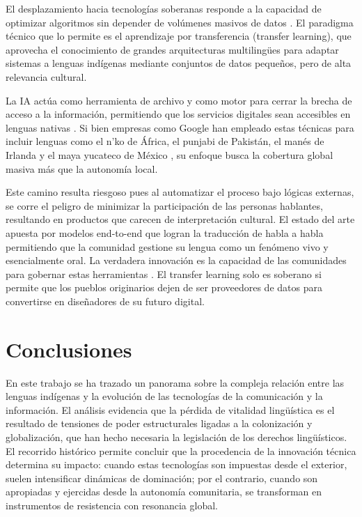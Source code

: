 \documentclass[spanish]{textolivre}
\begin{document}
El desplazamiento hacia tecnologías soberanas responde a la capacidad de optimizar algoritmos sin depender de volúmenes masivos de datos \cite{GonzalezSantillan2021,Joshi2020,Littell2018}. El paradigma técnico que lo permite es el aprendizaje por transferencia (transfer learning), que aprovecha el conocimiento de grandes arquitecturas multilingües para adaptar sistemas a lenguas indígenas mediante conjuntos de datos pequeños, pero de alta relevancia cultural.

La IA actúa como herramienta de archivo y como motor para cerrar la brecha de acceso a la información, permitiendo que los servicios digitales sean accesibles en lenguas nativas \cite{HornaSaldana2025}. Si bien empresas como Google han empleado estas técnicas para incluir lenguas como el n’ko de África, el punjabi de Pakistán, el manés de Irlanda y el maya yucateco de México \cite{Caswell2024}, su enfoque busca la cobertura global masiva más que la autonomía local.

Este camino resulta riesgoso pues al automatizar el proceso bajo lógicas externas, se corre el peligro de minimizar la participación de las personas hablantes, resultando en productos que carecen de interpretación cultural. El estado del arte apuesta por modelos end-to-end que logran la traducción de habla a habla permitiendo que la comunidad gestione su lengua como un fenómeno vivo y esencialmente oral. La verdadera innovación es la capacidad de las comunidades para gobernar estas herramientas \cite{Araujo2025}. El transfer learning solo es soberano si permite que los pueblos originarios dejen de ser proveedores de datos para convertirse en diseñadores de su futuro digital.

\section{Conclusiones}

En este trabajo se ha trazado un panorama sobre la compleja relación entre las lenguas indígenas y la evolución de las tecnologías de la comunicación y la información. El análisis evidencia que la pérdida de vitalidad lingüística es el resultado de tensiones de poder estructurales ligadas a la colonización y globalización, que han hecho necesaria la legislación de los derechos lingüísticos. El recorrido histórico permite concluir que la procedencia de la innovación técnica determina su impacto: cuando estas tecnologías son impuestas desde el exterior, suelen intensificar dinámicas de dominación; por el contrario, cuando son apropiadas y ejercidas desde la autonomía comunitaria, se transforman en instrumentos de resistencia con resonancia global.
\end{document}
